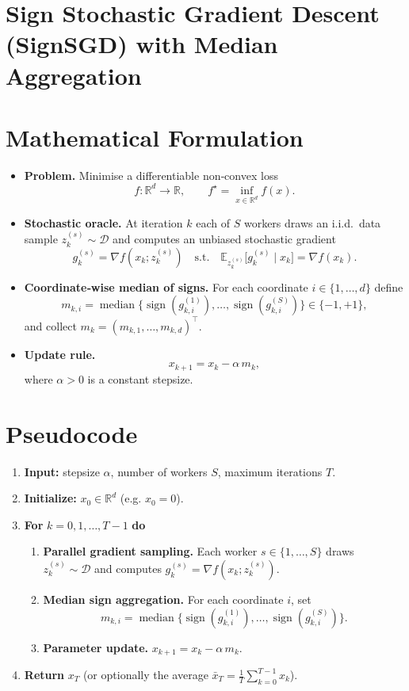 \documentclass[11pt]{article}
\newcommand{\E}{\mathbb{E}}
\newcommand{\R}{\mathbb{R}}
\newcommand{\sign}{\operatorname{sign}}
\begin{document}
\section*{Sign Stochastic Gradient Descent (SignSGD) with Median Aggregation}

\section*{Mathematical Formulation}
\begin{itemize}
    \item \textbf{Problem.} Minimise a differentiable non‑convex loss 
    \[
        f:\R^{d}\rightarrow\R,\qquad 
        f^{\star}= \inf_{x\in\R^{d}} f(x).
    \]
    \item \textbf{Stochastic oracle.} At iteration $k$ each of $S$ workers draws an i.i.d.\ data sample
    $z^{(s)}_{k}\sim\mathcal{D}$ and computes an unbiased stochastic gradient
    \[
        g^{(s)}_{k}= \nabla f(x_{k};z^{(s)}_{k})\quad\text{s.t.}\quad
        \E_{z^{(s)}_{k}}\!\big[g^{(s)}_{k}\mid x_{k}\big]=\nabla f(x_{k}).
    \]
    \item \textbf{Coordinate‑wise median of signs.} For each coordinate $i\in\{1,\dots,d\}$ define
    \[
        m_{k,i}= \operatorname{median}\big\{\sign(g^{(1)}_{k,i}),\dots,\sign(g^{(S)}_{k,i})\big\}\in\{-1,+1\},
    \]
    and collect $m_{k}=(m_{k,1},\dots,m_{k,d})^{\top}$.
    \item \textbf{Update rule.}
    \[
        x_{k+1}=x_{k}-\alpha\, m_{k},
    \]
    where $\alpha>0$ is a constant stepsize.
\end{itemize}

\section*{Pseudocode}
\begin{enumerate}[leftmargin=*, label=\textbf{Step \arabic*.}]
    \item \textbf{Input:} stepsize $\alpha$, number of workers $S$, maximum iterations $T$.
    \item \textbf{Initialize:} $x_{0}\in\R^{d}$ (e.g. $x_{0}=0$).
    \item \textbf{For} $k=0,1,\dots,T-1$ \textbf{do}
    \begin{enumerate}[label=\roman*.]
        \item \textbf{Parallel gradient sampling.} Each worker $s\in\{1,\dots,S\}$ draws $z^{(s)}_{k}\sim\mathcal{D}$ and computes $g^{(s)}_{k}= \nabla f(x_{k};z^{(s)}_{k})$.
        \item \textbf{Median sign aggregation.} For each coordinate $i$, set 
        \[
            m_{k,i}= \operatorname{median}\big\{\sign(g^{(1)}_{k,i}),\dots,\sign(g^{(S)}_{k,i})\big\}.
        \]
        \item \textbf{Parameter update.} $x_{k+1}=x_{k}-\alpha\, m_{k}$.
    \end{enumerate}
    \item \textbf{Return} $x_{T}$ (or optionally the average $\bar x_{T}= \tfrac1T\sum_{k=0}^{T-1}x_{k}$).
\end{enumerate}
\end{document}

